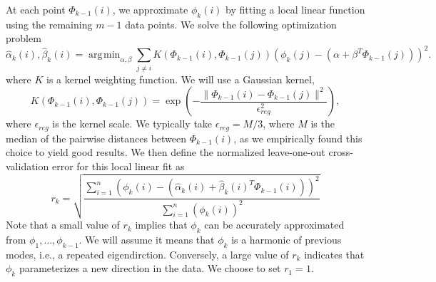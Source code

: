 \documentclass[preprint]{elsarticle}
\DeclareMathOperator*{\argmin}{\arg\!\min}
\begin{document}
At each point $\Phi_{k-1}(i)$, we approximate $\phi_k(i)$ by fitting a local linear function using the remaining $m-1$ data points. 
%
We solve the following optimization problem 
\begin{equation} \label{eq:opt_problem}
\hat{\alpha}_k (i) , \hat{\beta}_k(i)  = \argmin_{\alpha, \beta} \sum_{j \ne i} K(\Phi_{k-1}(i), \Phi_{k-1}(j)) \left( \phi_{k}(j) - (\alpha + \beta^T \Phi_{k-1}(j)) \right)^2.
\end{equation}
%
where $K$ is a kernel weighting function.
%
We will use a Gaussian kernel, 
%
\begin{equation}
K(\Phi_{k-1}(i), \Phi_{k-1}(j))  = \exp \left( - \frac{\|\Phi_{k-1}(i) - \Phi_{k-1} (j) \|^2}{\epsilon_{reg}^2} \right),
\end{equation}
%
where $\epsilon_{reg}$ is the kernel scale. 
%
We typically take $\epsilon_{reg} = M / 3$, where $M$ is the median of the pairwise distances between $\Phi_{k-1}(i)$, as we empirically found this choice to yield good results. 
%
We then define the normalized leave-one-out cross-validation error for this local linear fit as
\begin{equation} \label{eq:cv_error}
r_{k} = \sqrt{ \frac{\sum_{i=1}^n \left( \phi_{k} (i) - (\hat{\alpha}_k(i) + \hat{\beta}_k(i)^T \Phi_{k-1}(i))  \right)^2} {\sum_{i=1}^n  \left( \phi_{k} (i) \right)^2 }}
\end{equation}
%
Note that a small value of $r_k$ implies that $\phi_{k}$ can be accurately approximated from $\phi_1, \dots, \phi_{k-1}$. We will assume it means that $\phi_k$ is a harmonic of previous modes, i.e., a repeated eigendirction.
%
Conversely, a large value of $r_{k}$ indicates that $\phi_{k}$ parameterizes a new direction in the data.
%
We choose to set $r_1 = 1$.
\end{document}
